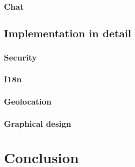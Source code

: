 \documentclass[11pt,draft,oneside]{fithesis}
\begin{document}
	\subsection{Chat}
\section{Implementation in detail}
	\subsection{Security}
	\subsection{I18n}
	\subsection{Geolocation}
	\subsection{Graphical design}
\chapter{Conclusion}


\end{document}
